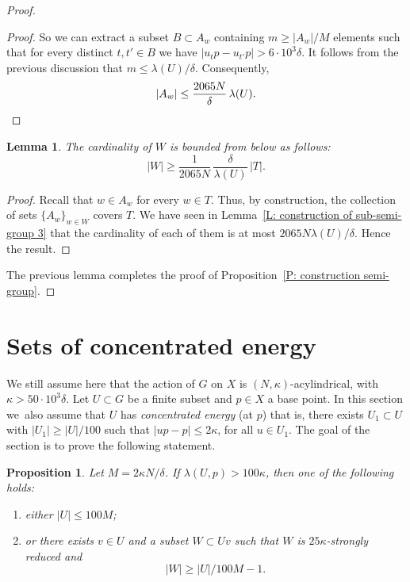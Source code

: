 \documentclass[JEP,XML,SOM,Unicode, NoEqCountersInSection,published]{cedram}
\theoremstyle{plain}
\newtheorem{prop}[thm]{Proposition}
\newtheorem{lem}[thm]{Lemma}
\theoremstyle{definition}
\begin{document}
\begin{proof}
\begin{proof}
So we can extract a subset $B \subset A_w$ containing $m \geq |A_w| / M$ elements such that for every distinct $t,t' \in B$ we have $|u_tp - u_{t'}p| > 6\cdot 10^3\delta$.
It follows from the previous discussion that $m \leq \lambda(U) / \delta$.
Consequently,
\begin{equation*}
|A_w| \leq \frac{2065N}{\delta}\, \lambda(U). \qedhere
\end{equation*}
\end{proof}

\begin{lem}\label{L: construction of sub-semi-group 6}
The cardinality of $W$ is bounded from below as follows:
\[
|W|\geqslant \frac 1{2065N}\,\frac \delta{\lambda(U)}\, |T|.
\]
\end{lem}

\begin{proof}
Recall that $w \in A_w$ for every $w \in T$.
Thus, by construction, the collection of sets $\{A_w\}_{w \in W}$ covers $T$.
We have seen in Lemma~\ref{L: construction of sub-semi-group 3} that the cardinality of each of them is at most $2065N\lambda(U)/\delta$.
Hence the result.
\end{proof}

The previous lemma completes the proof of Proposition~\ref{P: construction semi-group}.
\end{proof}

\section{Sets of concentrated energy}
We still assume here that the action of $G$ on $X$ is $(N, \kappa)$-acylindrical, with $\kappa > 50\cdot 10^3\delta$.
Let $U\subset G$ be a finite subset and $p \in X$ a base point.
In this section we~also assume that $U$ has \emph{concentrated energy} (at $p$) that is, there exists $U_1 \subset U$ with $|U_1| \geq |U|/100$ such that $|up-p|\leqslant 2\kappa$, for all $u\in U_1$.
The goal of the section is to prove the following statement.

\begin{prop}\label{P: main concentrated}
Let $M =2\kappa N/ \delta$.
If $\lambda(U,p)> 100\kappa$, then one of the following holds:
\begin{enumerate}
\item either $ |U| \leq 100M$;
\item or there exists $v \in U$ and a subset $W \subset Uv$ such that $W$ is $25\kappa$-strongly reduced and
\[
|W| \geq |U|/100M - 1.
\]
\end{enumerate}
\end{prop}
\end{document}
